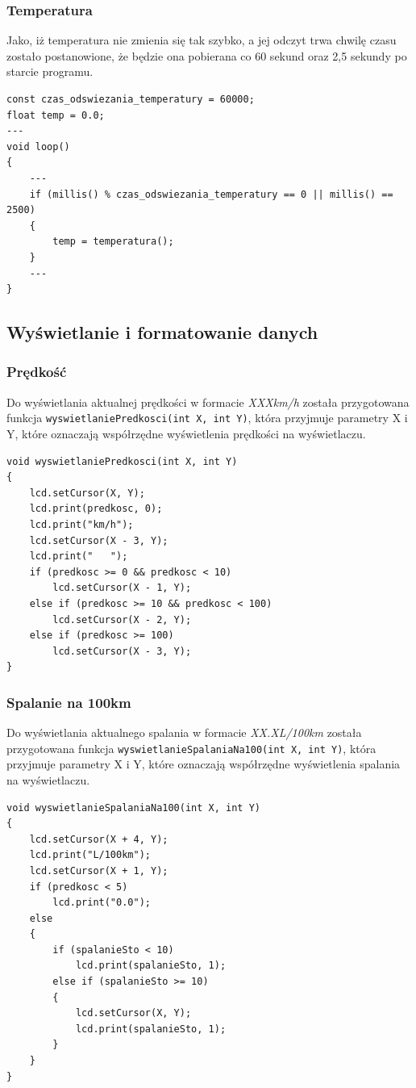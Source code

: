 \subsubsection{Temperatura}
Jako, iż temperatura nie zmienia się tak szybko, a jej odczyt trwa chwilę czasu zostało postanowione, że będzie ona pobierana co 60 sekund oraz 2,5 sekundy po starcie programu.
\begin{lstlisting}[label=list:temp_refresh_rate,caption=Implementacja odświeżania temperatury,
basicstyle=\footnotesize\ttfamily]
const czas_odswiezania_temperatury = 60000;
float temp = 0.0;
---
void loop()
{
    ---
    if (millis() % czas_odswiezania_temperatury == 0 || millis() == 2500)
    {
        temp = temperatura();
    }
    ---
}

\end{lstlisting}

\subsection{Wyświetlanie i formatowanie danych}
\subsubsection{Prędkość}
Do wyświetlania aktualnej prędkości w formacie \textit{XXXkm/h} została przygotowana funkcja \texttt{wyswietlaniePredkosci(int X, int Y)}, która przyjmuje parametry X i Y, które oznaczają współrzędne wyświetlenia prędkości na wyświetlaczu.
\begin{lstlisting}[label=list:show_speed,caption=Wyświetlanie prędkości,
basicstyle=\footnotesize\ttfamily]
void wyswietlaniePredkosci(int X, int Y)
{
    lcd.setCursor(X, Y);
    lcd.print(predkosc, 0);
    lcd.print("km/h");
    lcd.setCursor(X - 3, Y);
    lcd.print("   ");
    if (predkosc >= 0 && predkosc < 10)
    	lcd.setCursor(X - 1, Y);
    else if (predkosc >= 10 && predkosc < 100)
    	lcd.setCursor(X - 2, Y);
    else if (predkosc >= 100)
    	lcd.setCursor(X - 3, Y);
}
\end{lstlisting}
\subsubsection{Spalanie na 100km}
Do wyświetlania aktualnego spalania w formacie \textit{XX.XL/100km} została przygotowana funkcja \texttt{wyswietlanieSpalaniaNa100(int X, int Y)}, która przyjmuje parametry X i Y, które oznaczają współrzędne wyświetlenia spalania na wyświetlaczu.
\begin{lstlisting}[label=list:show_fuel_cons_100,caption=Wyświetlanie spalania na 100km,
basicstyle=\footnotesize\ttfamily]
void wyswietlanieSpalaniaNa100(int X, int Y)
{
    lcd.setCursor(X + 4, Y);
    lcd.print("L/100km");
    lcd.setCursor(X + 1, Y);
    if (predkosc < 5)
    	lcd.print("0.0");
    else
    {
    	if (spalanieSto < 10)
    		lcd.print(spalanieSto, 1);
    	else if (spalanieSto >= 10)
    	{
    		lcd.setCursor(X, Y);
    		lcd.print(spalanieSto, 1);
    	}
    }
}
\end{lstlisting}

